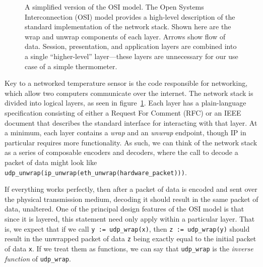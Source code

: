 \documentclass[twoside]{memoir}
\begin{document}
\begin{figure}[h]
    
    \caption{A simplified version of the OSI model.
    The Open Systems Interconnection (OSI) model provides a high-level description of the standard
implementation of the network stack.
Shown here are the wrap and unwrap components of each layer. Arrows show flow of data. Session, presentation, and application layers are combined into a single ``higher-level'' layer---these layers are unnecessary for our use case of a simple thermometer.}
    \label{fig:network-stack}
\end{figure}
Key to a networked temperature sensor is the code responsible for networking,
which allow two computers communicate over the internet.
The network stack is divided into logical layers, as seen in figure~\ref{fig:network-stack}.
Each layer has a plain-language specification
consisting of either a Request For Comment (RFC) or an IEEE document
that describes the standard interface for interacting with that layer.
At a minimum, each layer contains a \textit{wrap} and an \textit{unwrap}
endpoint, though IP in particular requires more functionality.
As such, we can think of the network stack as a series of composable
encoders and decoders,
where the call to decode a packet of data might look like
\lstinline{udp_unwrap(ip_unwrap(eth_unwrap(hardware_packet)))}.


If everything works perfectly, then after a packet of data is encoded
and sent over the physical transmission medium, decoding it should
result in the same packet of data, unaltered.
One of the principal design features of the OSI model is that since
it is layered, this statement need only apply within a particular layer.
That is, we expect that if we call
\lstinline{y := udp_wrap(x)}, then \lstinline{z := udp_wrap(y)} should
result in the unwrapped packet of data \lstinline{z} being exactly equal to
the initial packet of data \lstinline{x}.
If we treat them as functions, we can say that \lstinline{udp_wrap} is 
the \textit{inverse function} of \lstinline{udp_wrap}.
\end{document}
